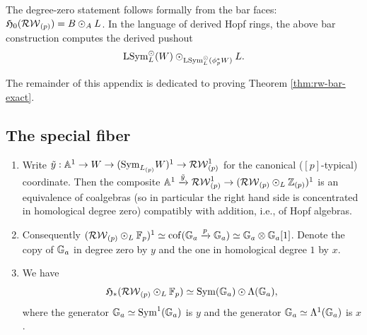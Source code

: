 \begin{remark}\label{rmk:rw-bar-derived}
The degree-zero statement follows formally from the bar faces: $\mathfrak H_0(\mathcal{RW}_{(p)})=B\odot_A L$.
In the language of derived Hopf rings, the above bar construction computes the derived pushout
\[
\operatorname{LSym}_L^\odot(W)\odot_{\operatorname{LSym}_L^\odot(\phi_p^*W)}L.
\]
\end{remark}

The remainder of this appendix is dedicated to proving Theorem \ref{thm:rw-bar-exact}.

\subsection{The special fiber}\label{app:rw-fiber}

\begin{lemma} \label{lemm:filter-derived-RW}
\begin{enumerate}
\item Write $\tilde y: \mathbb A^1 \to W \to (\mathrm{Sym}_{L_{(p)}} W)^1 \to \mathcal{RW}_{(p)}^1$ for the canonical ($[p]$-typical) coordinate.
  Then the composite $\mathbb A^1 \xrightarrow{\tilde y} \mathcal{RW}_{(p)}^1 \to (\mathcal{RW}_{(p)} \odot_L \mathbb{Z}_{(p)})^1$ is an equivalence of coalgebras (so in particular the right hand side is concentrated in homological degree zero) compatibly with addition, i.e., of Hopf algebras.
\item Consequently $(\mathcal{RW}_{(p)} \odot_L \mathbb{F}_p)^1 \simeq \operatorname{cof}({\mathbb G}_a \xrightarrow{p} {\mathbb G}_a) \simeq {\mathbb G}_a \otimes {\mathbb G}_a[1]$.
  Denote the copy of ${\mathbb G}_a$ in degree zero by $y$ and the one in homological degree $1$ by $x$.
\item We have \[ \mathfrak H_* (\mathcal{RW}_{(p)} \odot_L \mathbb{F}_p) \simeq \mathrm{Sym}({\mathbb G}_a) \odot \Lambda({\mathbb G}_a), \] where the generator ${\mathbb G}_a \simeq \mathrm{Sym}^1({\mathbb G}_a)$ is $y$ and the generator ${\mathbb G}_a \simeq \Lambda^1({\mathbb G}_a)$ is $x$.
\end{enumerate}
\end{lemma}
